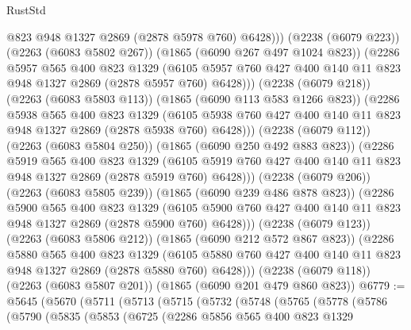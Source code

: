 \begin{lexlean}{RustStd}
\begin{coremodule}
                    @823
                    @948
                    @1327
                    @2869
                    (@2878 @5978 @760)
                    @6428)))
              (@2238 (@6079 @223))
              (@2263 (@6083 @5802 @267))
              (@1865 (@6090 @267 @497 @1024 @823))
              (@2286
                @5957
                @565
                @400
                @823
                @1329
                (@6105
                  @5957
                  @760
                  @427
                  @400
                  @140
                  @11
                  @823
                  @948
                  @1327
                  @2869
                  (@2878 @5957 @760)
                  @6428)))
            (@2238 (@6079 @218))
            (@2263 (@6083 @5803 @113))
            (@1865 (@6090 @113 @583 @1266 @823))
            (@2286
              @5938
              @565
              @400
              @823
              @1329
              (@6105 @5938 @760 @427 @400 @140 @11 @823 @948 @1327 @2869 (@2878 @5938 @760) @6428)))
          (@2238 (@6079 @112))
          (@2263 (@6083 @5804 @250))
          (@1865 (@6090 @250 @492 @883 @823))
          (@2286
            @5919
            @565
            @400
            @823
            @1329
            (@6105 @5919 @760 @427 @400 @140 @11 @823 @948 @1327 @2869 (@2878 @5919 @760) @6428)))
        (@2238 (@6079 @206))
        (@2263 (@6083 @5805 @239))
        (@1865 (@6090 @239 @486 @878 @823))
        (@2286
          @5900
          @565
          @400
          @823
          @1329
          (@6105 @5900 @760 @427 @400 @140 @11 @823 @948 @1327 @2869 (@2878 @5900 @760) @6428)))
      (@2238 (@6079 @123))
      (@2263 (@6083 @5806 @212))
      (@1865 (@6090 @212 @572 @867 @823))
      (@2286
        @5880
        @565
        @400
        @823
        @1329
        (@6105 @5880 @760 @427 @400 @140 @11 @823 @948 @1327 @2869 (@2878 @5880 @760) @6428)))
    (@2238 (@6079 @118))
    (@2263 (@6083 @5807 @201))
    (@1865 (@6090 @201 @479 @860 @823))
@6779 := @5645
    (@5670
      (@5711
        (@5713
          (@5715
            (@5732
              (@5748
                (@5765
                  (@5778
                    (@5786
                      (@5790
                        (@5835
                          (@5853
                            (@6725
                              (@2286
                                @5856
                                @565
                                @400
                                @823
                                @1329

\end{coremodule}
\end{lexlean}
